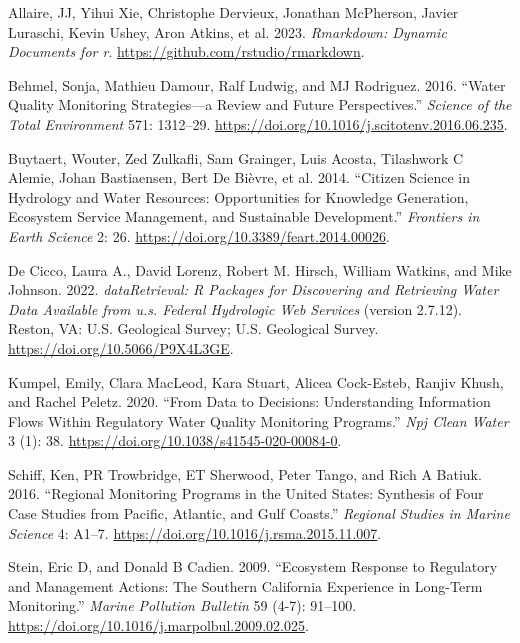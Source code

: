\hypertarget{refs}{}
\begin{CSLReferences}{1}{0}
\leavevmode{}%
Allaire, JJ, Yihui Xie, Christophe Dervieux, Jonathan McPherson, Javier Luraschi, Kevin Ushey, Aron Atkins, et al. 2023. \emph{Rmarkdown: Dynamic Documents for r}. \url{https://github.com/rstudio/rmarkdown}.

\leavevmode{}%
Behmel, Sonja, Mathieu Damour, Ralf Ludwig, and MJ Rodriguez. 2016. {``Water Quality Monitoring Strategies---a Review and Future Perspectives.''} \emph{Science of the Total Environment} 571: 1312--29. \url{https://doi.org/10.1016/j.scitotenv.2016.06.235}.

\leavevmode{}%
Buytaert, Wouter, Zed Zulkafli, Sam Grainger, Luis Acosta, Tilashwork C Alemie, Johan Bastiaensen, Bert De Bièvre, et al. 2014. {``Citizen Science in Hydrology and Water Resources: Opportunities for Knowledge Generation, Ecosystem Service Management, and Sustainable Development.''} \emph{Frontiers in Earth Science} 2: 26. \url{https://doi.org/10.3389/feart.2014.00026}.

\leavevmode{}%
De Cicco, Laura A., David Lorenz, Robert M. Hirsch, William Watkins, and Mike Johnson. 2022. \emph{dataRetrieval: R Packages for Discovering and Retrieving Water Data Available from u.s. Federal Hydrologic Web Services} (version 2.7.12). Reston, VA: U.S. Geological Survey; U.S. Geological Survey. \url{https://doi.org/10.5066/P9X4L3GE}.

\leavevmode{}%
Kumpel, Emily, Clara MacLeod, Kara Stuart, Alicea Cock-Esteb, Ranjiv Khush, and Rachel Peletz. 2020. {``From Data to Decisions: Understanding Information Flows Within Regulatory Water Quality Monitoring Programs.''} \emph{Npj Clean Water} 3 (1): 38. \url{https://doi.org/10.1038/s41545-020-00084-0}.

\leavevmode{}%
Schiff, Ken, PR Trowbridge, ET Sherwood, Peter Tango, and Rich A Batiuk. 2016. {``Regional Monitoring Programs in the United States: Synthesis of Four Case Studies from Pacific, Atlantic, and Gulf Coasts.''} \emph{Regional Studies in Marine Science} 4: A1--7. \url{https://doi.org/10.1016/j.rsma.2015.11.007}.

\leavevmode{}%
Stein, Eric D, and Donald B Cadien. 2009. {``Ecosystem Response to Regulatory and Management Actions: The Southern California Experience in Long-Term Monitoring.''} \emph{Marine Pollution Bulletin} 59 (4-7): 91--100. \url{https://doi.org/10.1016/j.marpolbul.2009.02.025}.


\end{CSLReferences}
